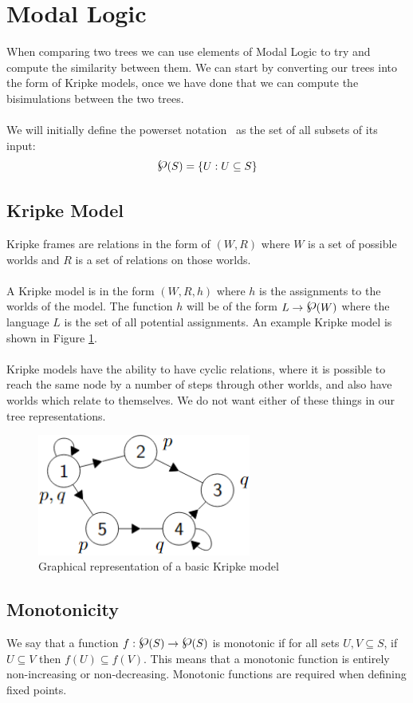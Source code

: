 \documentclass[12pt,twoside]{report}
\newcommand{\powerset}{\raisebox{.15\baselineskip}{\Large\ensuremath{\wp}}}
\begin{document}
\section{Modal Logic}
When comparing two trees we can use elements of Modal Logic to try and compute the similarity between them. We can start by converting our trees into the form of Kripke models, once we have done that we can compute the bisimulations between the two trees.~\cite{modallogic}
\\\\
We will initially define the powerset notation \powerset\ as the set of all subsets of its input:
$$\powerset(S) = \{U:U\subseteq S\}$$
\subsection{Kripke Model}
Kripke frames are relations in the form of $(W, R)$ where $W$ is a set of possible worlds and $R$ is a set of relations on those worlds.
\\\\
A Kripke model is in the form $(W, R, h)$ where $h$ is the assignments to the worlds of the model. The function $h$ will be of the form $L \rightarrow \powerset(W)$ where the language $L$ is the set of all potential assignments. An example Kripke model is shown in Figure \ref{fig:kripkemodel}.
\\\\
Kripke models have the ability to have cyclic relations, where it is possible to reach the same node by a number of steps through other worlds, and also have worlds which relate to themselves. We do not want either of these things in our tree representations.
\begin{figure}[h]
  \begin{center}
    \includegraphics[width=70mm]{images/naturalnumbers.png}
  \end{center}
  \caption{Graphical representation of a basic Kripke model}
  \label{fig:kripkemodel}
\end{figure}
\subsection{Monotonicity}
We say that a function $f:\powerset(S) \rightarrow \powerset(S)$ is monotonic if for all sets $U, V \subseteq S$, if $U \subseteq V$ then $f(U) \subseteq f(V)$. This means that a monotonic function is entirely non-increasing or non-decreasing. Monotonic functions are required when defining fixed points.
\end{document}

